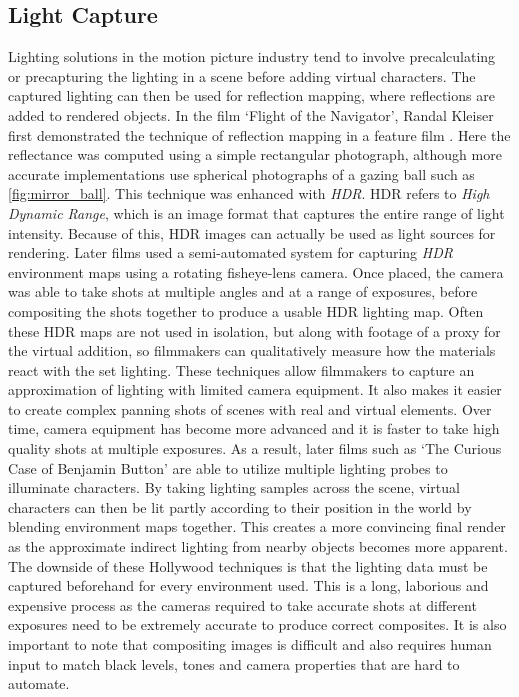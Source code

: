 \documentclass[ %
                    author={Gavin Parker},
                supervisor={Dr. Neill Campbell},
                    degree={MEng},
                     title={Deep Learning for Illumination Estimation from Stereo Images},
                  subtitle={},
                      type={Research},
                      year={2018} ]{dissertation}
\begin{document}
\subsection{Light Capture}
Lighting solutions in the motion picture industry tend to involve precalculating or precapturing the lighting in a scene before adding virtual characters. The captured lighting can then be used for reflection mapping, where reflections are added to rendered objects. In the film `Flight of the Navigator', Randal Kleiser first demonstrated the technique of reflection mapping in a feature film \cite{navigator}. Here the reflectance was computed using a simple rectangular photograph, although more accurate implementations use spherical photographs of a gazing ball such as \ref{fig:mirror_ball}. This technique was enhanced with \textit{HDR}. HDR refers to \textit{High Dynamic Range}, which is an image format that captures the entire range of light intensity. Because of this, HDR images can actually be used as light sources for rendering. Later films used a semi-automated system for capturing \textit{HDR} environment maps using a rotating fisheye-lens camera. Once placed, the camera was able to take shots at multiple angles and at a range of exposures, before compositing the shots together to produce a usable HDR lighting map. Often these HDR maps are not used in isolation, but along with footage of a proxy for the virtual addition, so filmmakers can qualitatively measure how the materials react with the set lighting. These techniques allow filmmakers to capture an approximation of lighting with limited camera equipment. It also makes it easier to create complex panning shots of scenes with real and virtual elements. Over time, camera equipment has become more advanced and it is faster to take high quality shots at multiple exposures. As a result, later films such as `The Curious Case of Benjamin Button' are able to utilize multiple lighting probes to illuminate characters. By taking lighting samples across the scene, virtual characters can then be lit partly according to their position in the world by blending environment maps together. This creates a more convincing final render as the approximate indirect lighting from nearby objects becomes more apparent. The downside of these Hollywood techniques is that the lighting data must be captured beforehand for every environment used. This is a long, laborious and expensive process as the cameras required to take accurate shots at different exposures need to be extremely accurate to produce correct composites. It is also important to note that compositing images is difficult and also requires human input to match black levels, tones and camera properties that are hard to automate.
\end{document}
